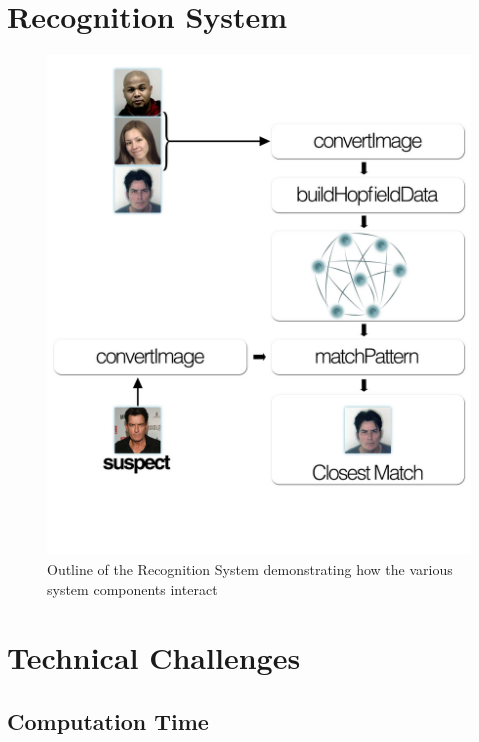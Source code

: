 \section{Recognition System}

\begin{figure}[h]
  \centering
\includegraphics[scale=0.3]{recognition.jpg}
\caption{Outline of the Recognition System demonstrating how the various system components interact}
\label{fig:system}
\end{figure}




\section{Technical Challenges}

\subsection{Computation Time}


